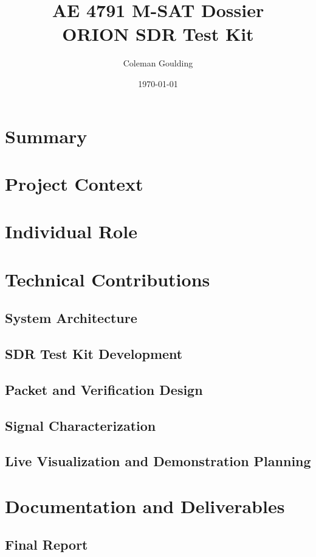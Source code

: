 \documentclass[11pt]{article}
\title{AE 4791 M-SAT Dossier\\ORION SDR Test Kit}
\author{Coleman Goulding}
\date{\today}
\begin{document}
\maketitle

\section{Summary}

\section{Project Context}

\section{Individual Role}

\section{Technical Contributions}

\subsection{System Architecture}

\subsection{SDR Test Kit Development}

\subsection{Packet and Verification Design}

\subsection{Signal Characterization}

\subsection{Live Visualization and Demonstration Planning}

\section{Documentation and Deliverables}

\subsection{Final Report}
\end{document}
